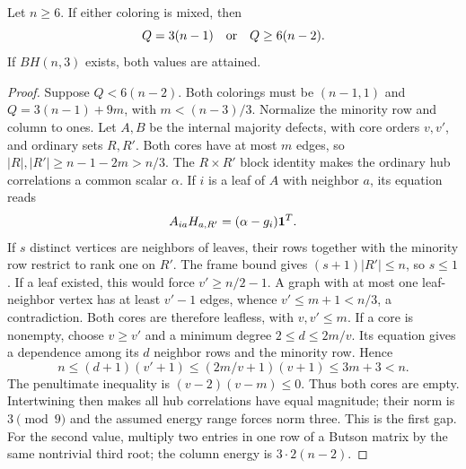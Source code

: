 \begin{theorem}\label{thm:second-gap}
Let $n\ge6$. If either coloring is mixed, then
\[Q=3(n-1)\quad\hbox{or}\quad Q\ge6(n-2).\]
If $BH(n,3)$ exists, both values are attained.
\end{theorem}
\begin{proof}
Suppose $Q<6(n-2)$. Both colorings must be $(n-1,1)$ and
$Q=3(n-1)+9m$, with $m<(n-3)/3$. Normalize the minority row and column to ones. Let $A,B$ be the internal majority defects, with core orders $v,v'$, and ordinary sets $R,R'$. Both cores have at most $m$ edges, so $|R|,|R'|\ge n-1-2m>n/3$.
The $R\times R'$ block identity makes the ordinary hub correlations a common scalar $\alpha$. If $i$ is a leaf of $A$ with neighbor $a$, its equation reads
\[A_{ia}H_{a,R'}=(\alpha-g_i)\mathbf1^T.\]
If $s$ distinct vertices are neighbors of leaves, their rows together with the minority row restrict to rank one on $R'$. The frame bound gives $(s+1)|R'|\le n$, so $s\le1$. If a leaf existed, this would force $v'\ge n/2-1$. A graph with at most one leaf-neighbor vertex has at least $v'-1$ edges, whence $v'\le m+1<n/3$, a contradiction. Both cores are therefore leafless, with $v,v'\le m$.
If a core is nonempty, choose $v\ge v'$ and a minimum degree $2\le d\le2m/v$. Its equation gives a dependence among its $d$ neighbor rows and the minority row. Hence
\[n\le(d+1)(v'+1)\le(2m/v+1)(v+1)\le3m+3<n.\]
The penultimate inequality is $(v-2)(v-m)\le0$. Thus both cores are empty. Intertwining then makes all hub correlations have equal magnitude; their norm is $3\pmod9$ and the assumed energy range forces norm three. This is the first gap. For the second value, multiply two entries in one row of a Butson matrix by the same nontrivial third root; the column energy is $3\cdot2(n-2)$.
\end{proof}

